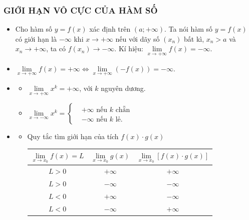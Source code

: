 \subsubsection{GIỚI HẠN VÔ CỰC CỦA HÀM SỐ}
\begin{itemize}
	\item [\iconMT]  Cho hàm số $y=f(x)$ xác định trên $\left({a;+\infty}\right) $. Ta nói hàm số $y=f(x)$ có giới hạn là $-\infty $ khi $x\to +\infty $ nếu với dãy số $\left({x_n}\right)$ bất kì, $x_n>a$ và $x_n\to +\infty $, ta có $f\left({x_n}\right)\to -\infty $.	Kí hiệu: $\lim\limits_{x\to +\infty}f(x)=-\infty $.
	\item [\iconMT]    $\lim\limits_{x\to +\infty}f(x)=+\infty \Leftrightarrow \lim\limits_{x\to +\infty}\left({-f(x)}\right)=-\infty $.
	\item [\iconMT] 
	\begin{khung}
		\begin{itemize}
			\item $\lim\limits_{x\to +\infty}x^k=+\infty $, với $k$ nguyên dương.
			\item $\lim\limits_{x\to -\infty}x^k=\left\{\begin{aligned}& +\infty \text{ nếu } k \text{ chẵn} \\
				& -\infty \text{ nếu } k \text{ lẻ}. 
			\end{aligned}\right. $
		\end{itemize}
	\end{khung}
\item [\iconMT] 
\begin{itemize}
	\item [$\bullet$] Quy tắc tìm giới hạn của tích $f(x)\cdot g(x)$
	\begin{center}
		\begin{tabular}{|c|c|c|}
			\hline
			$\lim\limits_{x\to x_0}f(x)=L$ & $\lim\limits_{x\to x_0}g(x)$   & $\lim\limits_{x\to x_0}\left[{f(x)\cdot g(x)}\right]$ \\
			\hline
			$L>0$   & $+\infty $   & $+\infty $ \\
			\hline
			$L>0$    & $-\infty $    & $-\infty $ \\
			\hline
			$L<0$   & $+\infty $   & $-\infty $ \\
			\hline
			$L<0$    & $-\infty $    & $+\infty $ \\
			\hline
		\end{tabular}
	\end{center}

\end{itemize}
\end{itemize}
